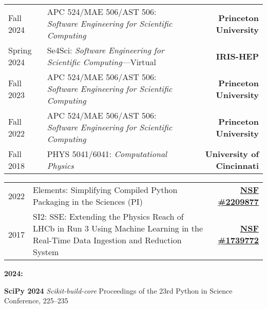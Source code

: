 \documentclass[10pt,letterpaper]{moderncv}
\begin{document}
\begin{tabularx}{\textwidth}{p{.8in}X>{\bfseries}r}
    Fall 2024 & APC 524/MAE 506/AST 506: \textit{Software Engineering for Scientific Computing} & Princeton University \\
    Spring 2024 & Se4Sci: \textit{Software Engineering for Scientific Computing}---Virtual & IRIS-HEP \\
    Fall 2023 & APC 524/MAE 506/AST 506: \textit{Software Engineering for Scientific Computing} & Princeton University \\
    Fall 2022 & APC 524/MAE 506/AST 506: \textit{Software Engineering for Scientific Computing} & Princeton University \\
    Fall 2018 & PHYS 5041/6041: \textit{Computational Physics} & University of Cincinnati \\
\end{tabularx}

\begin{tabularx}{\textwidth}{p{.5in}X>{\bfseries}r}
    2022 & Elements: Simplifying Compiled Python Packaging in the Sciences (PI) & \href{https://nsf.gov/awardsearch/showAward?AWD_ID=NSF 2209877}{NSF \#2209877} \\
    2017 & SI2\@: SSE\@: Extending the Physics Reach of LHCb in Run 3 Using Machine Learning in the Real-Time Data Ingestion and Reduction System & \href{https://nsf.gov/awardsearch/showAward?AWD_ID=1739772}{NSF \#1739772} \\ %
\end{tabularx}


\begin{minipage}[t]{.06\textwidth}
\textbf{2024:}
\end{minipage}%
\begin{minipage}[t]{.94\textwidth}
\textbf{SciPy 2024} \emph{Scikit-build-core} Proceedings of the 23rd Python in Science Conference, 225--235
\end{minipage}

\begin{comment}
This is waiting for publication. Supposed to be Q4 2024.
\begin{minipage}[t]{.06\textwidth}
\textbf{2023:}
\end{minipage}%
\begin{minipage}[t]{.94\textwidth}
\textbf{CHEP 2023} \emph{Advances in developing deep neural networks for finding primary vertices in proton-proton collisions at the LHC}
\end{minipage}
\end{comment}
\end{document}

